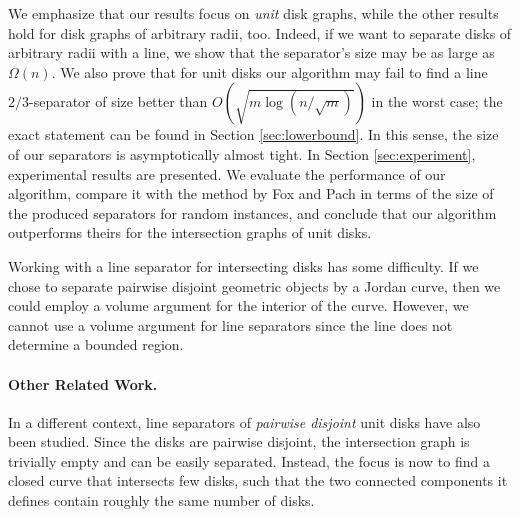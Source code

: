 \documentclass{llncs}
\begin{document}
We emphasize that our results focus on \emph{unit} disk graphs, while the other results hold for disk graphs of arbitrary radii, too. Indeed, if we want to separate disks of arbitrary radii with a line, we show that the separator's size may be as large as $\Omega(n)$. We also prove that for unit disks our algorithm may fail to find a line $2/3$-separator of size better than $O(\sqrt{m \log(n/\sqrt{m})})$ in the worst case; the exact statement can be found in Section \ref{sec:lowerbound}. In this sense, the size of our separators is asymptotically almost tight. In Section \ref{sec:experiment}, experimental results are presented.
We evaluate the performance of our algorithm, compare it with
the method by Fox and Pach \cite{Fox20081070} 
in terms of the size of the produced separators for random instances, and conclude that our algorithm outperforms theirs for the intersection graphs of unit disks.

Working with a line separator for intersecting disks has some difficulty.
If we chose to separate pairwise disjoint geometric objects by a Jordan curve, 
then we could employ a volume argument for the interior of the curve.
However, we cannot use a volume argument for line separators since
the line does not determine a bounded region.




\paragraph{Other Related Work.}
In a different context, line separators of \emph{pairwise disjoint} unit disks have also been studied. Since the disks are pairwise disjoint, the intersection graph is trivially empty and can be easily separated. Instead, the focus is now to find a closed curve that intersects few disks, such that the two connected components it defines contain roughly the same number of disks. 
\end{document}
